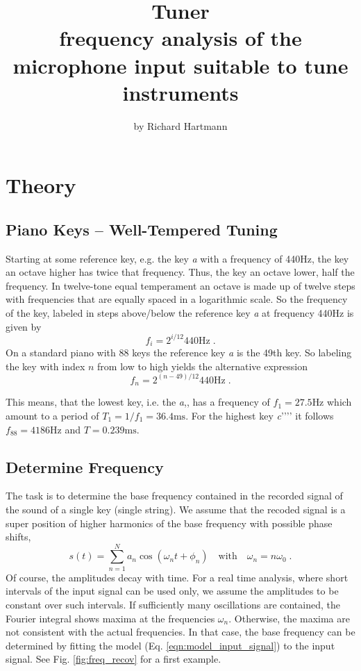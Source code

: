 \documentclass[10pt]{scrartcl}
\title{
Tuner \\
{\small frequency analysis of the microphone input suitable to tune instruments}
}
\author{by Richard Hartmann}
\newcommand{\kll}[1]{\textit{#1}{,}{,}}
\renewcommand{\k}[1]{\textit{#1}}
\newcommand{\khhhh}[1]{\textit{#1}{'}{'}{'}{'}}
\begin{document}
\maketitle
\newpage

\tableofcontents
\newpage

\section{Theory}

\subsection{Piano Keys -- Well-Tempered Tuning}

Starting at some reference key, e.g. the key \k{a} with a frequency of 440Hz, the key an octave higher has twice that frequency. 
Thus, the key an octave lower, half the frequency.
In twelve-tone equal temperament an octave is made up of twelve steps with frequencies that are equally spaced in a logarithmic scale.
So the frequency of the key, labeled in steps above/below the reference key \k{a} at frequency  440Hz is given by
\begin{equation}
    f_i = 2^{i/12} 440 \mathrm{Hz} \; .
\end{equation}
On a standard piano with 88 keys the reference key \k{a} is the 49th key.
So labeling the key with index $n$ from low to high yields the alternative expression
\begin{equation}
    f_n = 2^{(n-49)/12} 440 \mathrm{Hz} \; .
\end{equation}

This means, that the lowest key, i.e. the \kll{a} has a frequency of $f_1 = 27.5$Hz which amount to a period of $T_1 = 1/f_1 = 36.4\mathrm{ms}$. 
For the highest key \khhhh{c} it follows $f_{88} = 4186$Hz and $T = 0.239\mathrm{ms}$.


\subsection{Determine Frequency}

The task is to determine the base frequency contained in the recorded signal of the sound of a single key (single string).
We assume that the recoded signal is a super position of higher harmonics of the base frequency with possible phase shifts, 
\begin{equation}
    s(t) = \sum_{n=1}^N a_n \cos(\omega_n t + \phi_n)  \quad \text{with} \quad \omega_n = n \omega_0 \; .
    \label{eqn:model_input_signal}
\end{equation}
Of course, the amplitudes decay with time.
For a real time analysis, where short intervals of the input signal can be used only, we assume the amplitudes to be constant over such intervals.
If sufficiently many oscillations are contained, the Fourier integral shows maxima at the frequencies $\omega_n$.
Otherwise, the maxima are not consistent with the actual frequencies.
In that case, the base frequency can be determined by fitting the model (Eq. \eqref{eqn:model_input_signal}) to the input signal.
See Fig. \ref{fig:freq_recov} for a first example.
\end{document}
